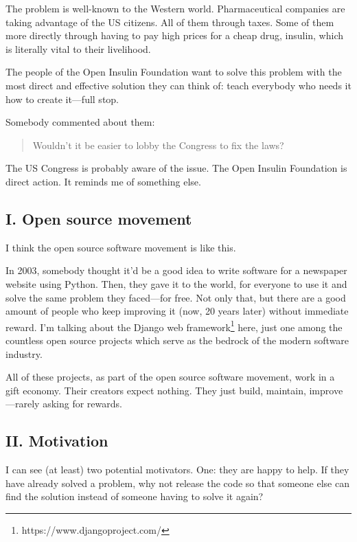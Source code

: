 The problem is well-known to the Western world. Pharmaceutical companies are taking advantage of the US citizens. All of them through taxes. Some of them more directly through having to pay high prices for a cheap drug, insulin, which is literally vital to their livelihood.

The people of the Open Insulin Foundation want to solve this problem with the most direct and effective solution they can think of: teach everybody who needs it how to create it—full stop.

Somebody commented about them:

\begin{quote}
    Wouldn’t it be easier to lobby the Congress to fix the laws?
\end{quote}

The US Congress is probably aware of the issue. The Open Insulin Foundation is direct action. It reminds me of something else.

\subsection{I. Open source movement}

I think the open source software movement is like this.

In 2003, somebody thought it’d be a good idea to write software for a newspaper website using Python. Then, they gave it to the world, for everyone to use it and solve the same problem they faced—for free. Not only that, but there are a good amount of people who keep improving it (now, 20 years later) without immediate reward. I’m talking about the Django web framework\footnote{https://www.djangoproject.com/} here, just one among the countless open source projects which serve as the bedrock of the modern software industry.

All of these projects, as part of the open source software movement, work in a gift economy. Their creators expect nothing. They just build, maintain, improve—rarely asking for rewards.

\subsection{II. Motivation}

I can see (at least) two potential motivators. One: they are happy to help. If they have already solved a problem, why not release the code so that someone else can find the solution instead of someone having to solve it again?

